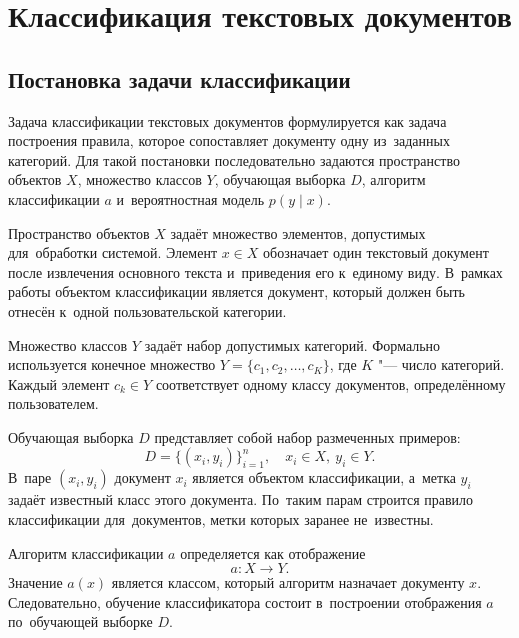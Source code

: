 \section{Классификация текстовых документов}\label{sec:ch1/classification}

\subsection{Постановка задачи классификации}\label{subsec:ch1/classification/placing_probleb}

Задача классификации текстовых документов формулируется как задача построения
правила, которое сопоставляет документу одну из~заданных категорий. Для такой
постановки последовательно задаются пространство объектов \( X \), множество
классов \( Y \), обучающая выборка \( D \), алгоритм классификации \( a \)
и~вероятностная модель \( p(y \mid x) \).

Пространство объектов \( X \) задаёт множество элементов, допустимых
для~обработки системой. Элемент \( x \in X \) обозначает один текстовый
документ после извлечения основного текста и~приведения его к~единому виду.
В~рамках работы объектом классификации является документ, который должен быть
отнесён к~одной пользовательской категории.

Множество классов \( Y \) задаёт набор допустимых категорий. Формально
используется конечное множество \( Y = \{c_1, c_2, \ldots, c_K\} \), где
\( K \) "--- число категорий. Каждый элемент \( c_k \in Y \) соответствует
одному классу документов, определённому пользователем.

Обучающая выборка \( D \) представляет собой набор размеченных
примеров:
\begin{equation}
    D = \{(x_i, y_i)\}_{i=1}^{n}, \quad x_i \in X,\ y_i \in Y.
\end{equation}
В~паре \( (x_i, y_i) \) документ \( x_i \) является объектом классификации,
а~метка \( y_i \) задаёт известный класс этого документа. По~таким парам
строится правило классификации для~документов, метки которых заранее
не~известны.

Алгоритм классификации \( a \) определяется как отображение
\begin{equation}
    a: X \rightarrow Y.
\end{equation}
Значение \( a(x) \) является классом, который алгоритм назначает документу
\( x \). Следовательно, обучение классификатора состоит в~построении
отображения \( a \) по~обучающей выборке \( D \).

